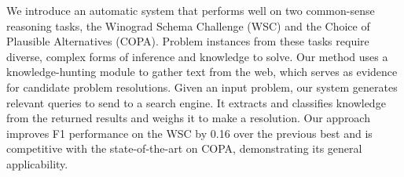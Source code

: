 We  introduce  an  automatic  system  that performs well on two common-sense reasoning tasks, the Winograd Schema Challenge (WSC) and the Choice of Plausible Alternatives  (COPA).  Problem  instances from  these  tasks  require  diverse,   complex  forms  of  inference  and  knowledge to solve.  Our method uses a knowledge-hunting  module  to  gather  text  from  the web,  which  serves  as  evidence  for  candidate problem resolutions.  Given an input  problem,  our  system  generates  relevant  queries  to  send  to  a  search  engine. It extracts and classifies knowledge from the returned results and weighs it to make a  resolution.   Our  approach  improves  F1 performance on the WSC by 0.16 over the previous best and is competitive with the state-of-the-art  on  COPA,  demonstrating its general applicability.
